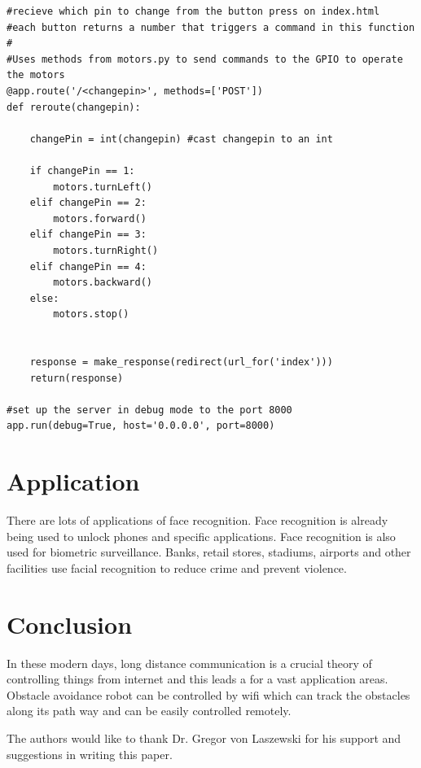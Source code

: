 \documentclass[sigconf]{acmart}
\begin{document}
\begin{lstlisting}
#recieve which pin to change from the button press on index.html
#each button returns a number that triggers a command in this function
#
#Uses methods from motors.py to send commands to the GPIO to operate the motors
@app.route('/<changepin>', methods=['POST'])
def reroute(changepin):

	changePin = int(changepin) #cast changepin to an int

	if changePin == 1:
		motors.turnLeft()
	elif changePin == 2:
		motors.forward()
	elif changePin == 3:
		motors.turnRight()
	elif changePin == 4:
		motors.backward()
	else:
		motors.stop()


	response = make_response(redirect(url_for('index')))
	return(response)

#set up the server in debug mode to the port 8000
app.run(debug=True, host='0.0.0.0', port=8000) 
\end{lstlisting}

\section{Application}
There are lots of applications of face recognition. Face recognition is already being used to unlock phones and specific applications. Face recognition is also used for biometric surveillance. Banks, retail stores, stadiums, airports and other facilities use facial recognition to reduce crime and prevent violence.

\section{Conclusion}
In these modern days, long distance communication is a crucial theory of controlling things from internet and this leads a for a vast application areas. Obstacle avoidance robot can be controlled by wifi which can track the obstacles along its path way and can be easily controlled remotely.

\begin{acks}

The authors would like to thank Dr. Gregor von Laszewski for his support and suggestions in writing this paper.

\end{acks}


 
\end{document}
